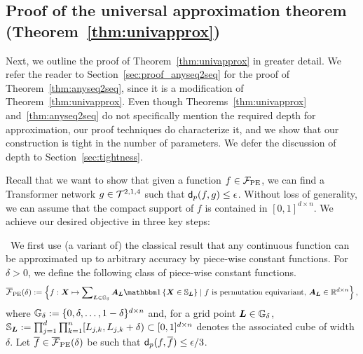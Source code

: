 \vspace*{-5pt}
\subsection{Proof of the universal approximation theorem (Theorem~\ref{thm:univapprox})}
\vspace*{-4pt}
\label{sec:proof-univapprox}

Next, we outline the proof of Theorem~\ref{thm:univapprox} in greater detail. We refer the reader to Section~\ref{sec:proof_anyseq2seq} for the proof of Theorem~\ref{thm:anyseq2seq}, since it is a modification of Theorem~\ref{thm:univapprox}. Even though Theorems~\ref{thm:univapprox} and~\ref{thm:anyseq2seq} do not specifically mention the required depth for approximation, our proof techniques do characterize it, and we show that our construction is tight in the number of parameters. We defer the discussion of depth to Section~\ref{sec:tightness}.

Recall that we want to show that given a function $f \in \mathcal{F}_{\rm PE}$, we can find a Transformer network $g \in \mathcal{T}^{2,1,4}$ such that $\mathsf{d}_p(f, g) \leq \epsilon$. Without loss of generality, we can assume that the compact support of $f$ is contained in $[0, 1]^{d \times n}$. We achieve our desired objective in three key steps:

\vspace{-2pt}
~We first use (a variant of) the classical result that any continuous function can be approximated up to arbitrary accuracy by piece-wise constant functions. For $\delta > 0$, we define the following class of piece-wise constant functions.
\begin{align*}
    \overline{\mc F}_{\rm PE}(\delta) \defeq
    \left \{ f: \mX \mapsto \sum\nolimits_{\mL \in \sG_{\delta}} \mA_\mL \indic{\mX \in \sS_\mL} 
    \mid
    f \text{ is permutation equivariant, } \mA_\mL \in \reals^{d \times n} \right \},
\end{align*}
where ${\mathbb{G}}_{\delta} := \{0, \delta, \dots, 1-\delta \}^{d \times n}$ and, for a grid point ${\bm{L}} \in {\mathbb{G}}_{\delta}$, ${\mathbb{S}}_{\bm{L}} := \prod_{j=1}^d \prod_{k=1}^n [{L}_{j,k}, {L}_{j,k}+\delta) \subset [0,1]^{d \times n}$ denotes the associated cube of width $\delta$. Let $\overline{f} \in \overline{\mathcal{F}}_{\rm PE}(\delta)$ be such that $\mathsf{d}_{p}(f, \overline{f}) \leq \epsilon/3$. 

